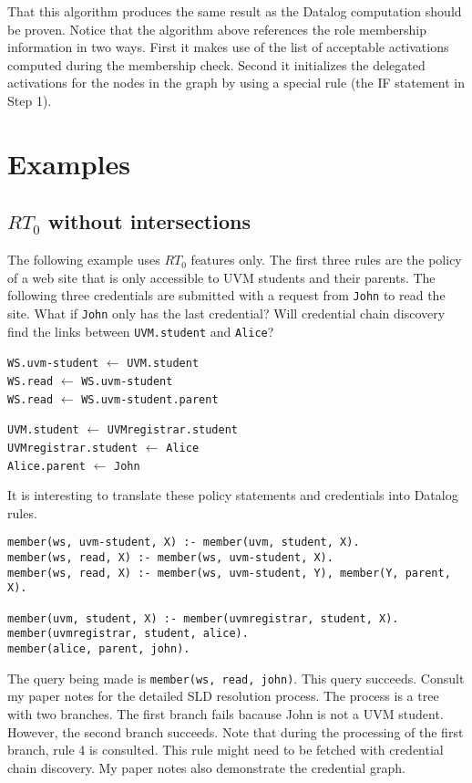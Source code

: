 \documentclass{article}
\begin{document}
That this algorithm produces the same result as the Datalog computation should be proven. Notice
that the algorithm above references the role membership information in two ways. First it makes
use of the list of acceptable activations computed during the membership check. Second it
initializes the delegated activations for the nodes in the graph by using a special rule (the IF
statement in Step 1).

\section{Examples}

\subsection{$RT_0$ without intersections}

The following example uses $RT_0$ features only. The first three rules are the policy of a web
site that is only accessible to UVM students and their parents. The following three credentials
are submitted with a request from \texttt{John} to read the site. What if \texttt{John} only has
the last credential? Will credential chain discovery find the links between \texttt{UVM.student}
and \texttt{Alice}?

\texttt{WS.uvm-student} $\leftarrow$ \texttt{UVM.student} \\
\texttt{WS.read} $\leftarrow$ \texttt{WS.uvm-student} \\
\texttt{WS.read} $\leftarrow$ \texttt{WS.uvm-student.parent}

\texttt{UVM.student} $\leftarrow$ \texttt{UVMregistrar.student} \\
\texttt{UVMregistrar.student} $\leftarrow$ \texttt{Alice} \\
\texttt{Alice.parent} $\leftarrow$ \texttt{John}

It is interesting to translate these policy statements and credentials into Datalog rules.

\begin{verbatim}
member(ws, uvm-student, X) :- member(uvm, student, X).
member(ws, read, X) :- member(ws, uvm-student, X).
member(ws, read, X) :- member(ws, uvm-student, Y), member(Y, parent, X).

member(uvm, student, X) :- member(uvmregistrar, student, X).
member(uvmregistrar, student, alice).
member(alice, parent, john).
\end{verbatim}

The query being made is \texttt{member(ws, read, john)}. This query succeeds. Consult my paper
notes for the detailed SLD resolution process. The process is a tree with two branches. The
first branch fails bacause John is not a UVM student. However, the second branch succeeds. Note
that during the processing of the first branch, rule 4 is consulted. This rule might need to be
fetched with credential chain discovery. My paper notes also demonstrate the credential graph.
\end{document}
